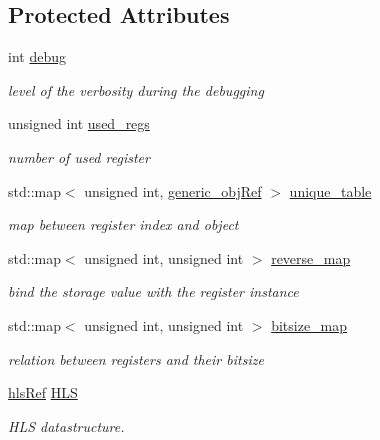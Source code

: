 \subsection*{Protected Attributes}
\begin{DoxyCompactItemize}
\item 
int \hyperlink{classreg__binding_acd367be4c720d7bfbb8ffc17a3dd8e43}{debug}
\begin{DoxyCompactList}\small\item\em level of the verbosity during the debugging \end{DoxyCompactList}\item 
unsigned int \hyperlink{classreg__binding_acce1c14e8ad516225ed5a39b25d89c72}{used\+\_\+regs}
\begin{DoxyCompactList}\small\item\em number of used register \end{DoxyCompactList}\item 
std\+::map$<$ unsigned int, \hyperlink{generic__obj_8hpp_acb533b2ef8e0fe72e09a04d20904ca81}{generic\+\_\+obj\+Ref} $>$ \hyperlink{classreg__binding_a2fccab59e8e8657e60998633aa791de9}{unique\+\_\+table}
\begin{DoxyCompactList}\small\item\em map between register index and object \end{DoxyCompactList}\item 
std\+::map$<$ unsigned int, unsigned int $>$ \hyperlink{classreg__binding_a4de12bf39febad6cedc31610bf432c0d}{reverse\+\_\+map}
\begin{DoxyCompactList}\small\item\em bind the storage value with the register instance \end{DoxyCompactList}\item 
std\+::map$<$ unsigned int, unsigned int $>$ \hyperlink{classreg__binding_a849f9be37d56e16abe5386ee3f3a74b9}{bitsize\+\_\+map}
\begin{DoxyCompactList}\small\item\em relation between registers and their bitsize \end{DoxyCompactList}\item 
\hyperlink{hls_8hpp_a75d0c73923d0ddfa28c4843a802c73a7}{hls\+Ref} \hyperlink{classreg__binding_ab715d356b916ed5376a21628b556ef71}{H\+LS}
\begin{DoxyCompactList}\small\item\em H\+LS datastructure. \end{DoxyCompactList}\item 

\end{DoxyCompactItemize}

